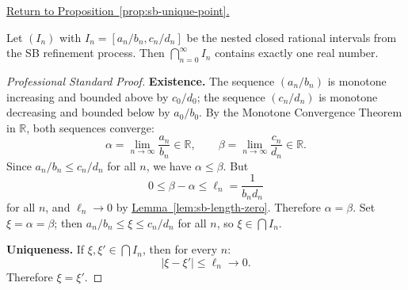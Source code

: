 
\newpage
{}
\label{prf:sb-unique-point}

\begin{remark*}[Return]
\hyperref[prop:sb-unique-point]{Return to Proposition~\ref*{prop:sb-unique-point}.}
\end{remark*}

\begin{proposition*}
Let $(I_n)$ with $I_n = [a_n/b_n, c_n/d_n]$ be the nested closed rational
intervals from the SB refinement process.  Then $\bigcap_{n=0}^{\infty} I_n$
contains exactly one real number.
\end{proposition*}

\begin{proof}[Professional Standard Proof]
\LRAProofBodyStart
\textbf{Existence.} The sequence $(a_n/b_n)$ is monotone increasing and
bounded above by $c_0/d_0$; the sequence $(c_n/d_n)$ is monotone decreasing
and bounded below by $a_0/b_0$.  By the Monotone Convergence Theorem in
$\mathbb{R}$, both sequences converge:
\[
\alpha = \lim_{n\to\infty} \frac{a_n}{b_n} \in \mathbb{R},
\qquad
\beta = \lim_{n\to\infty} \frac{c_n}{d_n} \in \mathbb{R}.
\]
Since $a_n/b_n \leq c_n/d_n$ for all $n$, we have $\alpha \leq \beta$.
But
\[
0 \leq \beta - \alpha \leq \ell_n = \frac{1}{b_n d_n}
\]
for all $n$, and $\ell_n \to 0$
by \hyperref[lem:sb-length-zero]{Lemma~\ref*{lem:sb-length-zero}}.
Therefore $\alpha = \beta$.  Set $\xi = \alpha = \beta$; then
$a_n/b_n \leq \xi \leq c_n/d_n$ for all $n$, so $\xi \in \bigcap I_n$.

\textbf{Uniqueness.} If $\xi, \xi' \in \bigcap I_n$, then for every $n$:
\[
|\xi - \xi'| \leq \ell_n \to 0.
\]
Therefore $\xi = \xi'$.
\end{proof}

